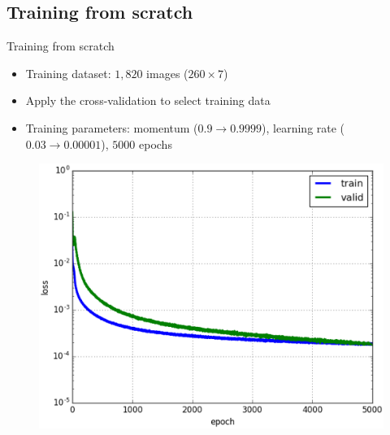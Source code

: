 \documentclass[10pt,svgnames]{beamer}
\begin{document}
\subsection{Training from scratch}
\begin{frame}{Training from scratch}{}
	\begin{itemize}
		\item Training dataset: \textbf{$1,820$} images ($260 \times 7$)
		\item Apply the cross-validation to select training data
		\item Training parameters: momentum ($0.9 \rightarrow 0.9999$), learning rate ($0.03 \rightarrow 0.00001$), $5000$ epochs\footnotemark
	\end{itemize}
	\begin{center}
     \begin{figure}[htbp]
        \centering
        \includegraphics[scale=.3]{images/loss_model_3}
    	\label{figrsexample1}
	\end{figure}
  \end{center}
	
\end{frame}
\end{document}
